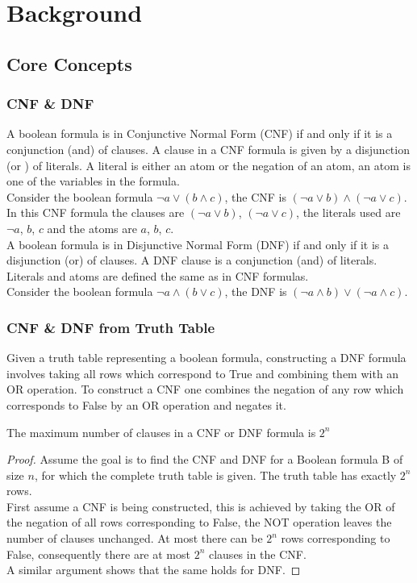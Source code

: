 \chapter{Background}\label{C:backgroundsurvey}
\section{Core Concepts}
\subsection{CNF \& DNF}
A boolean formula is in Conjunctive Normal Form (CNF) if and only if it is a conjunction (and) of clauses. A clause in a CNF formula is given by a disjunction (or ) of literals. A literal is either an atom or the negation of an atom, an atom is one of the variables in the formula.\\

Consider the boolean formula $\lnot a \lor (b \land c)$, the CNF is $(\lnot a \lor b) \land (\lnot a \lor c)$. In this CNF formula the clauses are $(\lnot a \lor b)$, $(\lnot a \lor c)$, the literals used are $\lnot a$, $b$, $c$ and the atoms are $a$, $b$, $c$.\\

A boolean formula is in Disjunctive Normal Form (DNF) if and only if it is a disjunction (or) of clauses. A DNF clause is a conjunction (and) of literals. Literals and atoms are defined the same as in CNF formulas.\\

Consider the boolean formula $\lnot a \land (b \lor c)$, the DNF is $(\lnot a \land b) \lor (\lnot a \land c)$.\\

\subsection{CNF \& DNF from Truth Table}
Given a truth table representing a boolean formula, constructing a DNF formula involves taking all rows which correspond to True and combining them with an OR operation. To construct a CNF one combines the negation of any row which corresponds to False by an OR operation and negates it.

\begin{theorem}
	The maximum number of clauses in a CNF or DNF formula is $2^n$
	\label{thm:max-clause-cnfdnf}
\end{theorem}

\begin{proof}
	Assume the goal is to find the CNF and DNF for a Boolean formula B of size $n$, for which the complete truth table is given. The truth table has exactly $2^n$ rows.\\
	
	First assume a CNF is being constructed, this is achieved by taking the OR of the negation of all rows corresponding to False, the NOT operation leaves the number of clauses unchanged. At most there can be $2^n$ rows corresponding to False, consequently there are at most $2^n$ clauses in the CNF.\\
	
	A similar argument shows that the same holds for DNF.
\end{proof}

